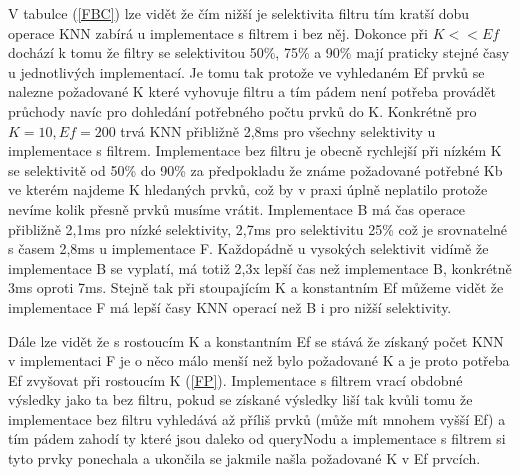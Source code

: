 \documentclass[czech,semestral,dept460,male,csharp,cpdeclaration]{diploma}
\begin{document}
		V tabulce (\ref{FBC}) lze vidět že čím nižší je selektivita filtru tím kratší dobu operace KNN zabírá u implementace s filtrem i bez něj. Dokonce při $K << Ef$ dochází k tomu že filtry se selektivitou 50\%, 75\% a 90\% mají praticky stejné časy u jednotlivých implementací. Je tomu tak protože ve vyhledaném Ef prvků se nalezne požadované K které vyhovuje filtru a tím pádem není potřeba provádět průchody navíc pro dohledání potřebného počtu prvků do K. Konkrétně pro $K = 10, Ef = 200$ trvá KNN přibližně 2,8ms pro všechny selektivity u implementace s filtrem. Implementace bez filtru je obecně rychlejší při nízkém K se selektivitě od 50\% do 90\% za předpokladu že známe požadované potřebné Kb ve kterém najdeme K hledaných prvků, což by v praxi úplně neplatilo protože nevíme kolik přesně prvků musíme vrátit. Implementace B má čas operace přibližně 2,1ms pro nízké selektivity, 2,7ms pro selektivitu 25\% což je srovnatelné s časem 2,8ms u implementace F. Každopádně u vysokých selektivit vidímě že implementace B se vyplatí, má totiž 2,3x lepší čas než implementace B, konkrétně 3ms oproti 7ms. Stejně tak při stoupajícím K a konstantním Ef můžeme vidět že implementace F má lepší časy KNN operací než B i pro nižší selektivity.
		 
		Dále lze vidět že s rostoucím K a konstantním Ef se stává že získaný počet KNN v implementaci F je o něco málo menší než bylo požadované K a je proto potřeba Ef zvyšovat při rostoucím K (\ref{FP}). Implementace s filtrem vrací obdobné výsledky jako ta bez filtru, pokud se získané výsledky liší tak kvůli tomu že implementace bez filtru vyhledává až příliš prvků (může mít mnohem vyšší Ef) a tím pádem zahodí ty které jsou daleko od queryNodu a implementace s filtrem si tyto prvky ponechala a ukončila se jakmile našla požadované K v Ef prvcích.
		
\end{document}
